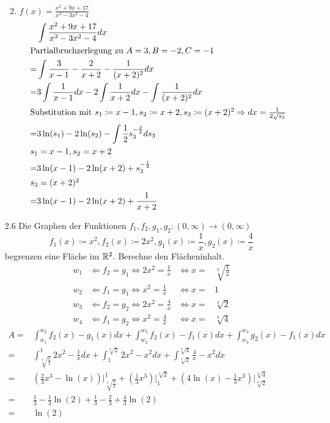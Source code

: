 \documentclass{HM}
\begin{document}
\begin{enumerate}
\begin{enumerate}
\begin{align*}
			\end{align*}
			\item $f(x)=\frac{x^2+9x+17}{x^3-3x^2-4}$
			\begin{align*}
			&\int\frac{x^2+9x+17}{x^3-3x^2-4}dx\\
			\intertext{Partialbruchzerlegung zu $A=3, B=-2, C=-1$}
			=&\int\frac{3}{x-1}-\frac{2}{x+2}-\frac{1}{(x+2)^2}dx\\
			=&3\int\frac{1}{x-1}dx-2\int\frac{1}{x+2}dx-\int\frac{1}{(x+2)^2}dx\\
			\intertext{Substitution mit $s_1\coloneqq x-1, s_2\coloneqq x+2, s_3\coloneqq (x+2)^2 \Rightarrow dx=\frac{1}{2\sqrt{s_3}}$}
			=&3\ln(s_1)-2\ln(s_2)-\int\frac{1}{2}s_3^{-\frac{3}{2}}ds_3\\
			\intertext{$s_1=x-1,s_2=x+2$}
			=&3\ln(x-1)-2\ln(x+2)+s_3^{-\frac{1}{2}}\\
			\intertext{$s_3=(x+2)^2$}
			=&3\ln(x-1)-2\ln(x+2)+\frac{1}{x+2}
			\end{align*}
		\end{enumerate}
		\item [2.6] Die Graphen der Funktionen $f_1,f_2,g_1,g_2:(0,\infty)\to(0,\infty)$
		$$f_1(x)\coloneqq x^2, f_2(x)\coloneqq 2x^2, g_1(x)\coloneqq\frac{1}{x},g_2(x)\coloneqq\frac{4}{x}$$
		begrenzen eine Fläche im $\mathbb{R}^2$. Berechne den Flächeninhalt.
		\begin{align*}
		w_1 &\Leftarrow f_2=g_1 \Leftrightarrow 2x^2=\frac{1}{x}&\Leftrightarrow x=&\sqrt[3]{\frac{1}{2}}\\
		w_2 &\Leftarrow f_1=g_1 \Leftrightarrow x^2=\frac{1}{x}&\Leftrightarrow x=&1\\
		w_3 &\Leftarrow f_2=g_2 \Leftrightarrow 2x^2=\frac{4}{x}&\Leftrightarrow x=&\sqrt[3]{2}\\
		w_4 &\Leftarrow f_1=g_2\Leftrightarrow x^2=\frac{4}{x}&\Leftrightarrow x=&\sqrt[3]{4}
		\end{align*}
		\begin{align*}
		A=&\int_{w_1}^{w_2}f_2(x)-g_1(x)dx+\int_{w_2}^{w_3}f_2(x)-f_1(x)dx+\int_{w_3}^{w_4}g_2(x)-f_1(x)dx\\
		=&\int_{\sqrt[3]{\tfrac{1}{2}}}^{1}2x^2-\frac{1}{x}dx+\int_{1}^{\sqrt[3]{2}}2x^2-x^2dx+\int_{\sqrt[3]{2}}^{\sqrt[3]{4}}\frac{4}{x}-x^2dx\\
		=&\left(\frac{2}{3}x^3-\ln(x)\right)\biggr|_{\sqrt[3]{\tfrac{1}{2}}}^1+\left(\frac{1}{3}x^3\right)\biggr|_1^{\sqrt[3]{2}}+\left(4\ln(x)-\frac{1}{3}x^3\right)\biggr|_{\sqrt[3]{2}}^{\sqrt[3]{4}}\\
		=&\frac{1}{3}-\frac{1}{3}\ln(2)+\frac{1}{3}-\frac{2}{3}+\frac{4}{3}\ln(2)\\
		=&\ln(2)
		\end{align*}
		

\end{enumerate}
\end{document}
